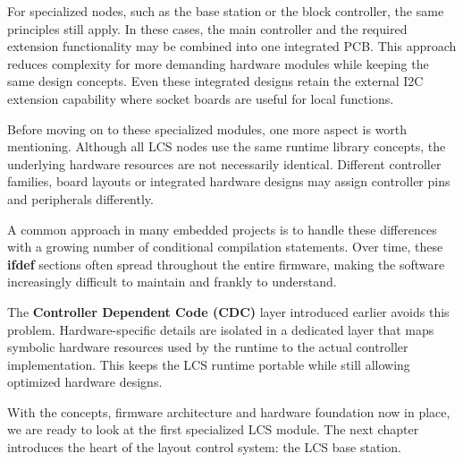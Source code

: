 For specialized nodes, such as the base station or the block controller, the
same principles still apply. In these cases, the main controller and the
required extension functionality may be combined into one integrated PCB.
This approach reduces complexity for more demanding hardware modules while
keeping the same design concepts. Even these integrated designs retain the
external I2C extension capability where socket boards are useful for local
functions.

Before moving on to these specialized modules, one more aspect is worth
mentioning. Although all LCS nodes use the same runtime library concepts,
the underlying hardware resources are not necessarily identical. Different
controller families, board layouts or integrated hardware designs may assign
controller pins and peripherals differently.

A common approach in many embedded projects is to handle these differences
with a growing number of conditional compilation statements. Over time,
these \textbf{ifdef} sections often spread throughout the entire firmware,
making the software increasingly difficult to maintain and frankly 
to understand.

The \textbf{Controller Dependent Code (CDC)} layer introduced earlier avoids
this problem. Hardware-specific details are isolated in a dedicated layer
that maps symbolic hardware resources used by the runtime to the actual
controller implementation. This keeps the LCS runtime portable while still
allowing optimized hardware designs.

With the concepts, firmware architecture and hardware foundation now in
place, we are ready to look at the first specialized LCS module. The next
chapter introduces the heart of the layout control system: the LCS base
station.
